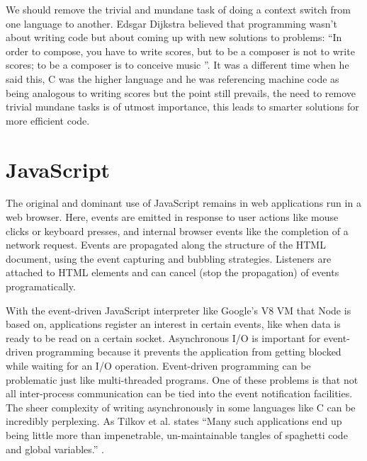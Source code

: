 \documentclass[12pt]{article} %
\begin{document}
We should remove the trivial and mundane task of doing a context switch from one language to another. Edsgar Dijkstra believed that programming wasn't about writing code but about coming up with new solutions to problems:
``In order to compose, you have to write scores, but to be a composer is not to write scores; to be a composer is to conceive music ''\cite{10}.
It was a different time when he said this, C was the higher language and he was referencing machine code as being analogous to writing scores but the point still prevails, the need to remove trivial mundane tasks is of utmost importance, this leads to smarter solutions for more efficient code.


\section{JavaScript} %

The original and dominant use of JavaScript remains in web applications run in a web browser. Here, events are emitted in response to user actions like mouse clicks or keyboard presses, and internal browser events like the completion of a network request. Events are propagated along the structure of the HTML document, using the event capturing and bubbling strategies. Listeners are attached to HTML elements and can cancel (stop the propagation) of events programatically.

With the event-driven JavaScript interpreter like Google's V8 VM that Node is based on, applications register an interest in certain events, like when data is ready to be read on a certain socket.
Asynchronous I/O is important for event-driven programming because it prevents the application from getting blocked while waiting for an I/O operation.
Event-driven programming can be problematic just like multi-threaded programs. One of these problems is that not all inter-process communication can be tied into the event notification facilities. The sheer complexity of writing asynchronously in some languages like C can be incredibly perplexing. As Tilkov et al. states ``Many such applications end up being little more than impenetrable, un-maintainable tangles of spaghetti code and global variables.'' \cite{4}.
\end{document}
